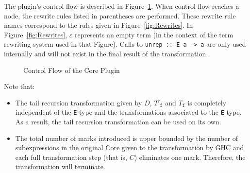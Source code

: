 \documentclass[runningheads, a4paper]{llncs}
\newcommand{\ttt}{\texttt}
\begin{document}
The plugin's control flow is described in Figure~\ref{fig:CorePlugin}. When control
flow reaches a node, the rewrite rules listed in parentheses are performed. These rewrite
rule names correspond to the rules given in Figure~\ref{fig:Rewrites}.
%
In Figure~\ref{fig:Rewrites},
$\varepsilon$ represents an empty term (in the context of the term rewriting system used in that Figure). Calls
to \ttt{unrep :: E a -> a} are only used internally and will not exist in
the final result of the transformation.
%
\begin{figure}
  \centering
   \caption{Control Flow of the Core Plugin}
   \label{fig:CorePlugin}
\end{figure}%

Note that:
\begin{itemize}
  \item The tail recursion transformation given by $D$, $T'_{\ttt{f}}$ and $T_{\ttt{f}}$ is completely independent of the \ttt{E} type and the transformations associated to the \ttt{E} type. As a result, the tail recursion transformation can be used on its own.

  \item The total number of marks introduced is upper bounded by the number of
subexpressions in the original Core given to the transformation by GHC and each
full transformation step (that is, $C$) eliminates one mark. Therefore, the
transformation will terminate.
\end{itemize}
\end{document}
